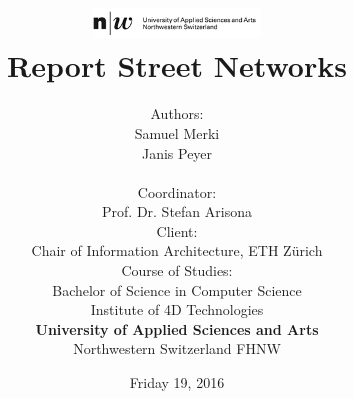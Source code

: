 \documentclass[11pt, a4paper]{report}
\begin{document}
\title{
    \includegraphics[width=1.75in]{fhnw_fhnw_logo_en.png} \\
    \vspace*{1in}
    \textbf{Report Street Networks}}
\author{
    Authors: \\
    Samuel Merki\\
    Janis Peyer\\
    \vspace*{0.4in} \\
    Coordinator: \\
    Prof. Dr. Stefan Arisona
    \vspace*{0.4in} \\
    Client: \\
    Chair of Information Architecture,
    ETH Zürich
    \vspace*{0.4in} \\
    Course of Studies: \\ Bachelor of Science in Computer Science
    \vspace*{0.4in} \\
    Institute of 4D Technologies \\
    \textbf{University of Applied Sciences and Arts  }\\
    Northwestern Switzerland FHNW
} \date{Friday 19, 2016}
\maketitle



\tableofcontents



\pagebreak


\pagebreak


\pagebreak






\pagebreak


\pagebreak


\pagebreak


\pagebreak



\appendix
\printnoidxglossaries
\end{document}
